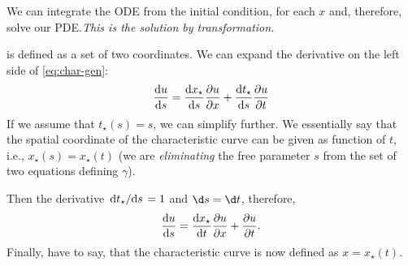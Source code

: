 \documentclass[justified, nobib, a4page]{tufte-handout}
\begin{document}
\begin{marginfigure}
  \begin{center}
  \end{center}
  \caption{The characteristic curve \(\gamma\) plotted in the \(x\)-\(t\) coordinate
  system along with the initial condition \(u_0(x)\). The arrows denote integration 
  direction along the ODE defined on \(\gamma\).}\label{fig:ch1}
\end{marginfigure}

We can integrate the ODE from the initial condition, for each \(x\) and, therefore,
solve our PDE.\@ \emph{This is the solution by transformation.}

 is defined as a set of two coordinates. We can 
expand the derivative on the left side of \cref{eq:char-gen}:
\[
  \odv{u}{s} = \odv{x_\star}{s}\pdv{u}{x} + \odv{t_\star}{s}\pdv{u}{t}
\]
If we assume that \(t_\star(s) = s\), we can simplify further. We essentially
say that the spatial coordinate of the characteristic curve can be given as
function of \(t\), i.e., \(x_\star(s) = x_\star(t)\) (we are \emph{eliminating}
the free parameter \(s\) from the set of two equations defining \(\gamma\)).  

Then the derivative \(\odv{t_\star}/{s} = 1\) and \(\d s = \d t\), therefore, 
\begin{equation}
  \odv{u}{s} = \odv{x_\star}{t}\pdv{u}{x} + \pdv{u}{t}.
  \label{eq:duds}
\end{equation}
Finally, have to say, that the characteristic curve is now defined as
\(x=x_\star(t)\).
\end{document}

